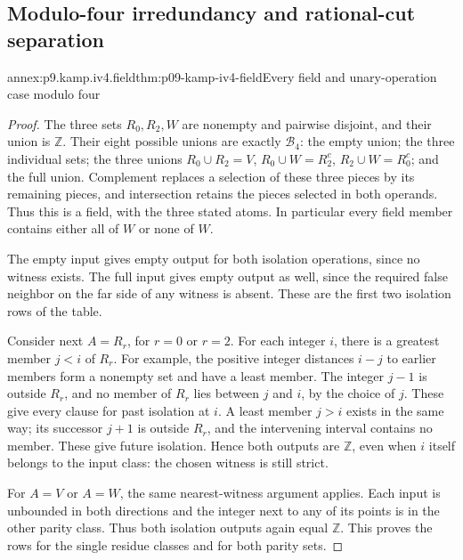 
\subsection{Modulo-four irredundancy and rational-cut separation}
\label{sec:annex-p09-kamp-iv4-iv5-separations}

\begin{annexitem}{annex:p9.kamp.iv4.field}{thm:p09-kamp-iv4-field}{Every field and unary-operation case modulo four}
\begin{proof}
The three sets \(R_0,R_2,W\) are nonempty and pairwise
disjoint, and their union is \(\mathbb Z\). Their eight
possible unions are exactly \(\mathcal B_4\): the empty
union; the three individual sets; the three unions
\(R_0\cup R_2=V\), \(R_0\cup W=R_2^c\),
\(R_2\cup W=R_0^c\); and the full union.
Complement replaces a selection of these three pieces by
its remaining pieces, and intersection retains the pieces
selected in both operands. Thus this is a field, with the
three stated atoms. In particular every field member contains
either all of \(W\) or none of \(W\).

The empty input gives empty output for both isolation
operations, since no witness exists. The full input gives
empty output as well, since the required false neighbor on
the far side of any witness is absent. These are the first
two isolation rows of the table.

Consider next \(A=R_r\), for \(r=0\) or \(r=2\).
For each integer \(i\), there is a greatest member
\(j<i\) of \(R_r\). For example, the positive
integer distances \(i-j\) to earlier members form a
nonempty set and have a least member. The integer
\(j-1\) is outside \(R_r\), and no member of
\(R_r\) lies between \(j\) and \(i\), by the
choice of \(j\). These give every clause for past
isolation at \(i\). A least member \(j>i\) exists
in the same way; its successor \(j+1\) is outside
\(R_r\), and the intervening interval contains no
member. These give future isolation. Hence both outputs
are \(\mathbb Z\), even when \(i\) itself belongs
to the input class: the chosen witness is still strict.

For \(A=V\) or \(A=W\), the same nearest-witness
argument applies. Each input is unbounded in both directions
and the integer next to any of its points is in the other
parity class. Thus both isolation outputs again equal
\(\mathbb Z\). This proves the rows for the single
residue classes and for both parity sets.


\end{proof}
\end{annexitem}
